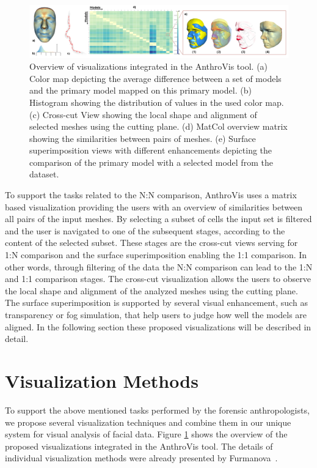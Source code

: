 \documentclass[final,5p,times]{elsarticle}
\begin{document}
\begin{figure}[htb]
	\centering
  \includegraphics[width=1.0\linewidth]{pictures/overview4.png}
  \caption{\label{fig:overview}Overview of visualizations integrated in the AnthroVis tool. (a) Color map depicting the average difference between a set of models and the primary model mapped on this primary model. (b) Histogram showing the distribution of values in the used color map. (c) Cross-cut View showing the local shape and alignment of selected meshes using the cutting plane. (d) MatCol overview matrix showing the similarities between pairs of meshes. (e) Surface superimposition views with different enhancements depicting the comparison of the primary model with a selected model from the dataset.}
\vspace{-2mm}
\end{figure}

To support the tasks related to the N:N comparison, AnthroVis uses a matrix based visualization providing the users with an overview of similarities between all pairs of the input meshes.
By selecting a subset of cells the input set is filtered and the user is navigated to one of the subsequent stages, according to the content of the selected subset.
These stages are the cross-cut views serving for 1:N comparison and the surface superimposition enabling the 1:1 comparison.
In other words, through filtering of the data the N:N comparison can lead to the 1:N and 1:1 comparison stages.
The cross-cut visualization allows the users to observe the local shape and alignment of the analyzed meshes using the cutting plane.
The surface superimposition is supported by several visual enhancement, such as transparency or fog simulation, that help users to judge how well the models are aligned.
In the following section these proposed visualizations will be described in detail.

\section{Visualization Methods} \label{exface}
To support the above mentioned tasks performed by the forensic anthropologists, we propose several visualization techniques and combine them in our unique system for visual analysis of facial data.
Figure \ref{fig:overview} shows the overview of the proposed visualizations integrated in the AnthroVis tool.
The details of individual visualization methods were already presented by Furmanova~\cite{Furmanova2015}.
\end{document}
